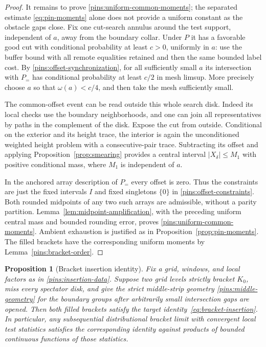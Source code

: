 \documentclass[11pt]{article}
\newtheorem{proposition}[theorem]{Proposition}
\theoremstyle{definition}
\theoremstyle{remark}
\numberwithin{equation}{section}
\begin{document}
\begin{proof}
It remains to prove \eqref{pins:uniform-common-moments}; the separated
estimate \eqref{eq:pin-moments} alone does not provide a uniform
constant as the obstacle gaps close.  Fix one cut-search annulus
around the test support, independent of $a$, away from the boundary
collar.  Under $P$ it has a favorable good cut with conditional
probability at least $c>0$, uniformly in $a$: use the buffer bound
with all remote equalities retained and then the same bounded label
cost.  By \eqref{pins:offset-synchronization}, for all sufficiently
small $a$ its intersection with $P_=$ has conditional probability
at least $c/2$ in mesh limsup.  More precisely choose $a$ so that
$\omega(a)<c/4$, and then take the mesh sufficiently small.

The common-offset event can be read outside this whole search disk.
Indeed its local checks use the boundary neighborhoods, and one can
join all representatives by paths in the complement of the disk.
Expose the cut from outside.  Conditional on the exterior and its
height trace, the interior is again the unconditioned weighted
height problem with a consecutive-pair trace.  Subtracting its
offset and applying Proposition~\ref{prop:smearing} provides a
central interval $|X_\delta|\le M_1$ with positive conditional mass,
where $M_1$ is independent of $a$.

In the anchored array description of $P_=$ every offset is zero.
Thus the constraints are just the fixed intervals $I$ and fixed
singletons $\{0\}$ in \eqref{pins:offset-constraints}.  Both rounded
midpoints of any two such arrays are admissible, without a parity
partition.  Lemma~\ref{lem:midpoint-amplification}, with the preceding
uniform central mass and bounded rounding error, proves
\eqref{pins:uniform-common-moments}.  Ambient exhaustion is justified
as in Proposition~\ref{prop:pin-moments}.  The filled brackets have
the corresponding uniform moments by Lemma~\ref{pins:bracket-order}.
\end{proof}

\begin{proposition}[Bracket insertion identity]\label{prop:bracket-insertion}
Fix a grid, windows, and local factors as in
\eqref{pins:insertion-data}.  Suppose two grid levels strictly bracket
$K_0$, miss every spectator disk, and give the strict middle-strip
geometry \eqref{pins:middle-geometry} for the boundary groups after
arbitrarily small intersection gaps are opened.  Then both filled
brackets satisfy the target identity~\eqref{eq:bracket-insertion}.
In particular, any subsequential distributional bracket limit with
convergent local test statistics satisfies the corresponding identity
against products of bounded continuous functions of those statistics.
\end{proposition}
\end{document}
